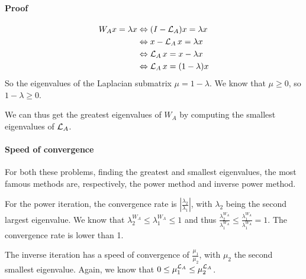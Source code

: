 \paragraph{Proof}

\begin{equation}
 \begin{split}
     W_A x = \lambda x & \Leftrightarrow (I - \operatorname{\mathcal{L}}_A)x = \lambda x \\
                     & \Leftrightarrow x - \operatorname{\mathcal{L}}_A x = \lambda x \\
                     & \Leftrightarrow \operatorname{\mathcal{L}}_A x = x - \lambda x \\
                     & \Leftrightarrow \operatorname{\mathcal{L}}_A x = (1 - \lambda) x
 \end{split}
\end{equation}
So the eigenvalues of the Laplacian submatrix \(\mu = 1 - \lambda\).
We know that \(\mu \ge 0\), so \(1 - \lambda \ge 0\).

We can thus get the greatest eigenvalues of \(W_A\) by computing the smallest eigenvalues of \(\operatorname{\mathcal{L}}_A\).

\paragraph{Speed of convergence}
For both these problems, finding the greatest and smallest eigenvalues, the most famous methods are, respectively, the power method and inverse power method.

For the power iteration, the convergence rate is \(|\frac{\lambda_2}{\lambda_1}|\), with \(\lambda_2\) being the second largest eigenvalue.
We know that \(\lambda^{W_A}_2 \le \lambda^{W_A}_1 \le 1\) and thus \(\frac{\lambda^{W_A}_2}{\lambda^{W_A}_1} \le \frac{\lambda^{W_A}_1}{\lambda^{W_A}_1} = 1\).
The convergence rate is lower than 1.

The inverse iteration has a speed of convergence of \(\frac{\mu_1}{\mu_2}\), with \(\mu_2\) the second smallest eigenvalue.
Again, we know that \(0 \le \mu^{\operatorname{\mathcal{L}}_A}_1 \le \mu^{\operatorname{\mathcal{L}}_A}_2\).
